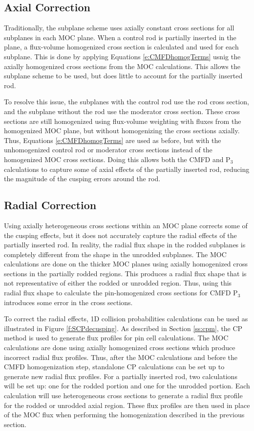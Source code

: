 \subsection{Axial Correction}

Traditionally, the subplane scheme uses axially constant cross sections for all subplanes in each MOC plane.  When a control rod is partially inserted in the plane, a flux-volume homogenized cross section is calculated and used for each subplane.  This is done by applying Equations \ref{e:CMFDhomogTerms} usnig the axially homogenized cross sections from the MOC calculations.  This allows the subplane scheme to be used, but does little to account for the partially inserted rod.

To resolve this issue, the subplanes with the control rod use the rod cross section, and the subplane without the rod use the moderator cross section.  These cross sections are still homogenized using flux-volume weighting with fluxes from the homogenized MOC plane, but without homogenizing the cross sections axially.  Thus, Equations \ref{e:CMFDhomogTerms} are used as before, but with the unhomogenized control rod or moderator cross sections instead of the homogenized MOC cross sections.  Doing this allows both the CMFD and P$_3$ calculations to capture some of axial effects of the partially inserted rod, reducing the magnitude of the cusping errors around the rod.

\subsection{Radial Correction}

Using axially heterogeneous cross sections within an MOC plane corrects some of the cusping effects, but it does not accurately capture the radial effects of the partially inserted rod.  In reality, the radial flux shape in the rodded subplanes is completely different from the shape in the unrodded subplanes.  The MOC calculations are done on the thicker MOC planes using axially homogenized cross sections in the partially rodded regions.  This produces a radial flux shape that is not representative of either the rodded or unrodded region.  Thus, using this radial flux shape to calculate the pin-homogenized cross sections for CMFD P$_3$ introduces some error in the cross sections.

To correct the radial effects, 1D collision probabilities calculations can be used as illustrated in Figure \ref{f:SCPdecusping}.  As described in Section \ref{ss:cpm}, the CP method is used to generate flux profiles for pin cell calculations.  The MOC calculations are done using axially homogenized cross sections which produce incorrect radial flux profiles.  Thus, after the MOC calculations and before the CMFD homogenization step, standalone CP calculations can be set up to generate new radial flux profiles.  For a partially inserted rod, two calculations will be set up: one for the rodded portion and one for the unrodded portion.  Each calculation will use heterogeneous cross sections to generate a radial flux profile for the rodded or unrodded axial region.  These flux profiles are then used in place of the MOC flux when performing the homogenization described in the previous section.

